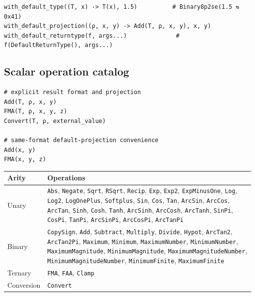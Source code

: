 \nopagebreak[4]
\begin{verbatim}
with_default_type((T, x) -> T(x), 1.5)          # Binary8p2se(1.5 ⇆ 0x41)
with_default_projection((ρ, x, y) -> Add(T, ρ, x, y), x, y)
with_default_returntype(f, args...)              # f(DefaultReturnType(), args...)
\end{verbatim}



\subsection{Scalar operation catalog}



\label{9067118353150552449}{}



\begin{verbatim}
# explicit result format and projection
Add(T, ρ, x, y)
FMA(T, ρ, x, y, z)
Convert(T, ρ, external_value)

# same-format default-projection convenience
Add(x, y)
FMA(x, y, z)
\end{verbatim}




\begin{table}[h]
\centering
\begin{tabulary}{\linewidth}{L L}
\toprule
Arity & Operations \\
\toprule
Unary & \texttt{Abs}, \texttt{Negate}, \texttt{Sqrt}, \texttt{RSqrt}, \texttt{Recip}, \texttt{Exp}, \texttt{Exp2}, \texttt{ExpMinusOne}, \texttt{Log}, \texttt{Log2}, \texttt{LogOnePlus}, \texttt{Softplus}, \texttt{Sin}, \texttt{Cos}, \texttt{Tan}, \texttt{ArcSin}, \texttt{ArcCos}, \texttt{ArcTan}, \texttt{Sinh}, \texttt{Cosh}, \texttt{Tanh}, \texttt{ArcSinh}, \texttt{ArcCosh}, \texttt{ArcTanh}, \texttt{SinPi}, \texttt{CosPi}, \texttt{TanPi}, \texttt{ArcSinPi}, \texttt{ArcCosPi}, \texttt{ArcTanPi} \\
Binary & \texttt{CopySign}, \texttt{Add}, \texttt{Subtract}, \texttt{Multiply}, \texttt{Divide}, \texttt{Hypot}, \texttt{ArcTan2}, \texttt{ArcTan2Pi}, \texttt{Maximum}, \texttt{Minimum}, \texttt{MaximumNumber}, \texttt{MinimumNumber}, \texttt{MaximumMagnitude}, \texttt{MinimumMagnitude}, \texttt{MaximumMagnitudeNumber}, \texttt{MinimumMagnitudeNumber}, \texttt{MinimumFinite}, \texttt{MaximumFinite} \\
Ternary & \texttt{FMA}, \texttt{FAA}, \texttt{Clamp} \\
Conversion & \texttt{Convert} \\
\bottomrule
\end{tabulary}

\end{table}




